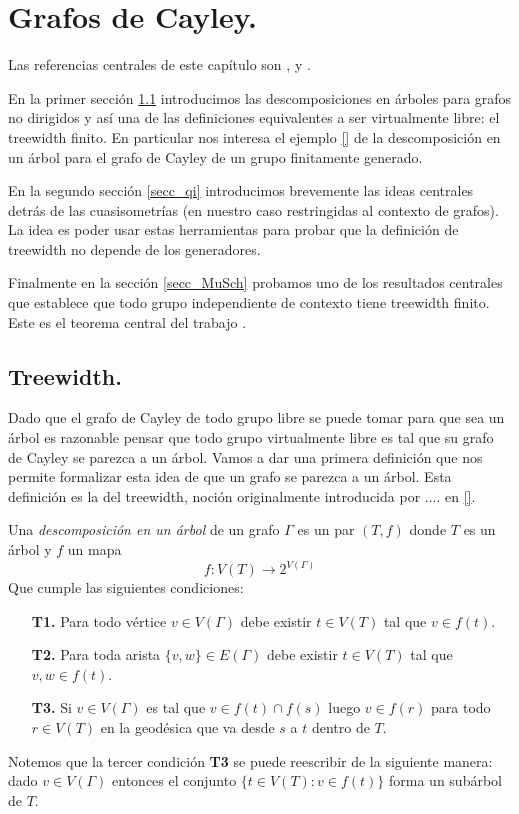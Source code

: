 \documentclass[tesis.tex]{subfiles}
\begin{document}
	
\chapter{Grafos de Cayley.} \label{seccion_treewidth}

Las referencias centrales de este capítulo son \cite{diekert2017context}, \cite{kuske2005logical} y \cite{diestel2005graph}.

En la primer sección \ref{secc_tw} introducimos las descomposiciones en árboles para grafos no dirigidos y así una de las definiciones equivalentes a ser virtualmente libre: el treewidth finito.
En particular nos interesa el ejemplo \ref{} de la descomposición en un árbol para el grafo de Cayley de un grupo finitamente generado.


En la segundo sección \ref{secc_qi} introducimos brevemente las ideas centrales detrás de las cuasisometrías (en nuestro caso restringidas al contexto de grafos).
La idea es poder usar estas herramientas para probar que la definición de treewidth no depende de los generadores.

Finalmente en la sección \ref{secc_MuSch} probamos uno de los resultados centrales que establece que todo grupo independiente de contexto tiene treewidth finito.
Este es el teorema central del trabajo \cite{muller1983groups}.



\section{Treewidth.}\label{secc_tw}

Dado que el grafo de Cayley de todo grupo libre se puede tomar para que sea un árbol es razonable pensar que todo grupo virtualmente libre es tal que su grafo de Cayley se parezca a un árbol. 
Vamos a dar una primera definición que nos permite formalizar esta idea de que un grafo se parezca a un árbol.
Esta definición es la del treewidth, noción originalmente introducida por .... en \ref{}.

\begin{deff}\label{desc-arbol}
	Una \emph{descomposición en un árbol} de un grafo $\Gamma$ es un par $(T,f)$ donde
	$T$ es un árbol y $f$ un mapa 
	\[
	f: V(T) \to 2^{V(\Gamma)}
	\]
	Que cumple las siguientes condiciones:
	\begin{enumerate}
		\item[\textbf{T1.}] Para todo vértice $v \in V(\Gamma)$ debe existir $t \in V(T)$ tal que $v \in f(t)$. 
		\item[\textbf{T2.}] Para toda arista $\{v,w\} \in E(\Gamma)$ 
		debe existir $t \in V(T)$ tal que $v,w \in f(t)$.
		\item[\textbf{T3.}] Si $v \in V(\Gamma)$ es tal que $v \in f(t) \cap f(s)$ luego $v \in f(r)$ para todo $r \in V(T)$ en la geodésica que va desde $s$ a $t$ dentro de $T$.  
	\end{enumerate} 
\end{deff}
Notemos que la tercer condición \textbf{T3} se puede reescribir de la siguiente manera:
dado $v \in V(\Gamma)$ entonces el conjunto $\{ t \in V(T) :  v \in f(t) \}$ forma un subárbol de $T$.
\end{document}
